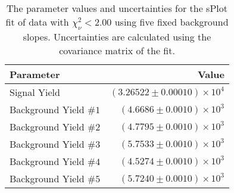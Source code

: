 
\begin{table}[ht]
    \begin{center}
        \begin{tabular}{lr}\toprule
            Parameter & Value \\\midrule
            Signal Yield & $(3.26522 \pm 0.00010) \times 10^{4}$ \\
            Background Yield $\#1$ & $(4.6686 \pm 0.0010) \times 10^{3}$ \\
            Background Yield $\#2$ & $(4.7795 \pm 0.0010) \times 10^{3}$ \\
            Background Yield $\#3$ & $(5.7533 \pm 0.0010) \times 10^{3}$ \\
            Background Yield $\#4$ & $(4.5274 \pm 0.0010) \times 10^{3}$ \\
            Background Yield $\#5$ & $(5.7240 \pm 0.0010) \times 10^{3}$ \\\bottomrule
        \end{tabular}
        \caption{The parameter values and uncertainties for the sPlot fit of data with $\chi^2_\nu < 2.00$ using five fixed background slopes. Uncertainties are calculated using the covariance matrix of the fit.}\label{tab:splot-fit-results-chisqdof-2.00-fixed-5}
    \end{center}
\end{table}
